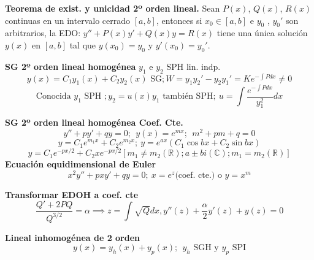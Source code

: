 \documentclass[10pt,landscape,letterpaper]{article}
\begin{document}
\begin{multicols}{3}
\textbf{Teorema de exist. y unicidad 2º orden lineal.} Sean $P(x)$, $Q(x)$, $R(x)$ continuas en un intervalo cerrado $[a,b]$, entonces si $x_0 \in [a, b]$ e $y_0$ , $y_0'$ son arbitrarios, la EDO: $y'' +P(x)y' +Q(x)y = R(x)$ tiene una única solución $y(x)$ en $[a, b]$ tal que $y(x_0) = y_0$ y $y'(x_0) = y_0'$.

\textbf{SG 2º orden lineal homogénea}
$y_1$ e $y_2$ SPH lin. indp.
\vspace{-5pt}
\[y(x)=C_1 y_1(x)+C_2 y_2(x) \mbox{ SG}; W=y_1 y_2' - y_2 y_1'=K e^{-\int{P dx}} \neq 0\]
\vspace{-15pt}
\[\mbox{Conocida } y_1 \mbox{ SPH }; y_2=u(x)y_1 \mbox{ también SPH}; \ u=\int{\frac{e^{-\int{P dx}}}{y_1^2}dx}\]
\vspace{-10pt}

\textbf{SG 2º orden lineal homogénea Coef. Cte.}
\vspace{-5pt}
\[y''+py'+qy=0; \ \ y(x)=e^{mx}; \ \ m^2+pm+q=0\]
\[y = C_1 e^{m_1x}+C_2 e^{m_2x}; \ y = e^{ax}(C_1 \cos{bx}+C_2\sin{bx})\]
\[y=C_1 e^{-px/2}+C_2 x e^{-px/2} [m_1 \neq m_2 (\mathbb{R}); a\pm bi (\mathbb{C}); m_1=m_2 (\mathbb{R})]\]%
\textbf{Ecuación equidimensional de Euler}
\vspace{-5pt}
\[x^2y''+pxy'+qy=0; \ x=e^z \mbox{(coef. cte.) o } y=x^{m}\]
\vspace{-12pt}

\textbf{Transformar EDOH a coef. cte}
\vspace{-4pt}
\[\frac{Q'+2PQ}{Q^{3/2}}=\alpha \implies z=\int{\sqrt{Q}dx},  y''(z)+ \frac{\alpha}{2}y'(z)+y(z)=0\]
\vspace{-8pt}

\textbf{Lineal inhomogénea de 2 orden}
\vspace{-5pt}
\[y(x)=y_h(x)+y_p(x); \ \ y_h \mbox{ SGH y } y_p \mbox{ SPI}\]
\vspace{-13pt}


\end{multicols}
\end{document}
